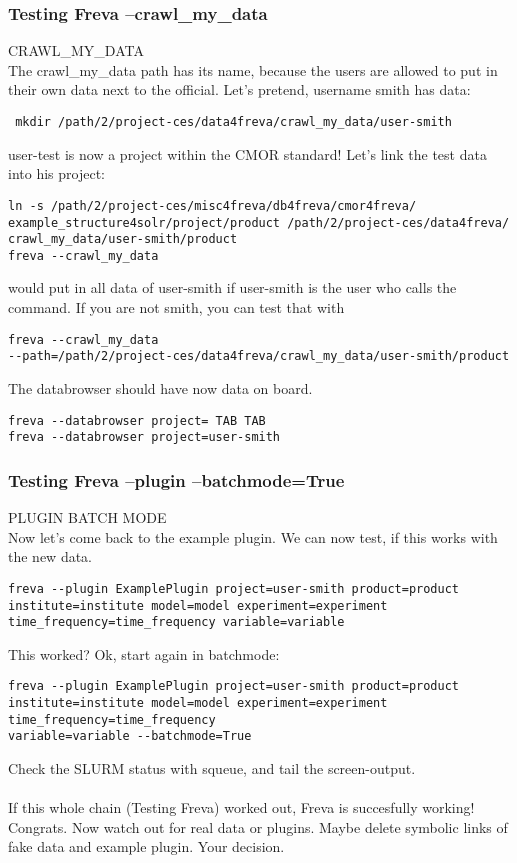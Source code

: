 \documentclass[a4paper,11pt]{ltxdoc}
\begin{document}
\subsubsection{Testing Freva --crawl\_my\_data}
CRAWL\_MY\_DATA \\
The crawl\_my\_data path has its name, because the users are allowed to put in their own data next to the official. Let's pretend, username smith has data:
\begin{verbatim} mkdir /path/2/project-ces/data4freva/crawl_my_data/user-smith\end{verbatim}
user-test is now a project within the CMOR standard! Let's link the test data into his project:
\begin{verbatim}ln -s /path/2/project-ces/misc4freva/db4freva/cmor4freva/
example_structure4solr/project/product /path/2/project-ces/data4freva/
crawl_my_data/user-smith/product
freva --crawl_my_data \end{verbatim}
would put in all data of user-smith if user-smith is the user who calls the command. If you are not smith, you can test that with
\begin{verbatim}freva --crawl_my_data 
--path=/path/2/project-ces/data4freva/crawl_my_data/user-smith/product\end{verbatim}
The databrowser should have now data on board.
\begin{verbatim}freva --databrowser project= TAB TAB
freva --databrowser project=user-smith\end{verbatim}
\subsubsection{Testing Freva --plugin --batchmode=True}
PLUGIN BATCH MODE \\
Now let's come back to the example plugin. We can now test, if this works with the new data.
\begin{verbatim}freva --plugin ExamplePlugin project=user-smith product=product 
institute=institute model=model experiment=experiment 
time_frequency=time_frequency variable=variable\end{verbatim}
This worked? Ok, start again in batchmode:
\begin{verbatim}freva --plugin ExamplePlugin project=user-smith product=product 
institute=institute model=model experiment=experiment time_frequency=time_frequency 
variable=variable --batchmode=True\end{verbatim}
Check the SLURM status with squeue, and tail the screen-output. \\
\\
If this whole chain (Testing Freva) worked out, Freva is succesfully working! Congrats. Now watch out for real data or plugins. Maybe delete symbolic links of fake data and example plugin. Your decision.



 
\end{document}

